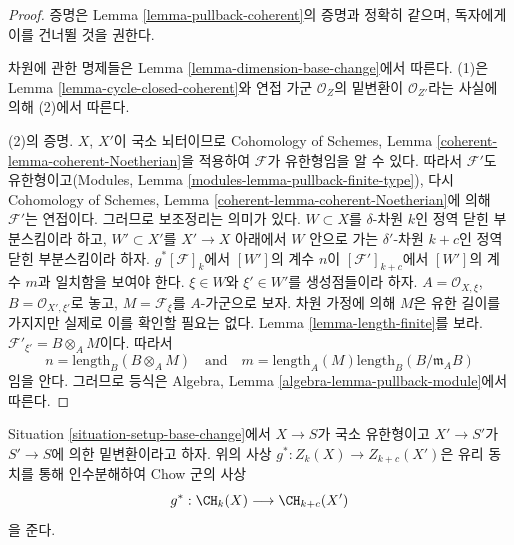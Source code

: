 \begin{proof}
증명은 Lemma \ref{lemma-pullback-coherent}의 증명과 정확히 같으며,
독자에게 이를 건너뛸 것을 권한다.

\medskip\noindent
차원에 관한 명제들은 Lemma \ref{lemma-dimension-base-change}에서
따른다. (1)은 Lemma \ref{lemma-cycle-closed-coherent}와 연접 가군
$\mathcal{O}_Z$의 밑변환이 $\mathcal{O}_{Z'}$라는 사실에 의해
(2)에서 따른다.

\medskip\noindent
(2)의 증명. $X$, $X'$이 국소 뇌터이므로 Cohomology of Schemes,
Lemma \ref{coherent-lemma-coherent-Noetherian}을 적용하여
$\mathcal{F}$가 유한형임을 알 수 있다. 따라서 $\mathcal{F}'$도
유한형이고(Modules, Lemma
\ref{modules-lemma-pullback-finite-type}), 다시 Cohomology of
Schemes, Lemma \ref{coherent-lemma-coherent-Noetherian}에 의해
$\mathcal{F}'$는 연접이다. 그러므로 보조정리는 의미가 있다.
$W \subset X$를 $\delta$-차원 $k$인 정역 닫힌 부분스킴이라 하고,
$W' \subset X'$를 $X' \to X$ 아래에서 $W$ 안으로 가는
$\delta'$-차원 $k + c$인 정역 닫힌 부분스킴이라 하자.
$g^*[\mathcal{F}]_k$에서 $[W']$의 계수 $n$이
$[\mathcal{F}']_{k + c}$에서 $[W']$의 계수 $m$과 일치함을 보여야
한다. $\xi \in W$와 $\xi' \in W'$를 생성점들이라 하자.
$A = \mathcal{O}_{X, \xi}$, $B = \mathcal{O}_{X', \xi'}$로 놓고,
$M = \mathcal{F}_\xi$를 $A$-가군으로 보자. 차원 가정에 의해 $M$은
유한 길이를 가지지만 실제로 이를 확인할 필요는 없다. Lemma
\ref{lemma-length-finite}를 보라.
$\mathcal{F}'_{\xi'} = B \otimes_A M$이다. 따라서
$$
n = \text{length}_B(B \otimes_A M)
\quad
\text{and}
\quad
m = \text{length}_A(M) \text{length}_B(B/\mathfrak m_AB)
$$
임을 안다. 그러므로 등식은 Algebra, Lemma
\ref{algebra-lemma-pullback-module}에서 따른다.
\end{proof}

\begin{lemma}
\label{lemma-pullback-base-change}
Situation \ref{situation-setup-base-change}에서 $X \to S$가 국소
유한형이고 $X' \to S'$가 $S' \to S$에 의한 밑변환이라고 하자.
위의 사상 $g^* : Z_k(X) \to Z_{k + c}(X')$은 유리 동치를 통해
인수분해하여 Chow 군의 사상
$$
g^* : \CH_k(X) \longrightarrow \CH_{k + c}(X')
$$
을 준다.
\end{lemma}

